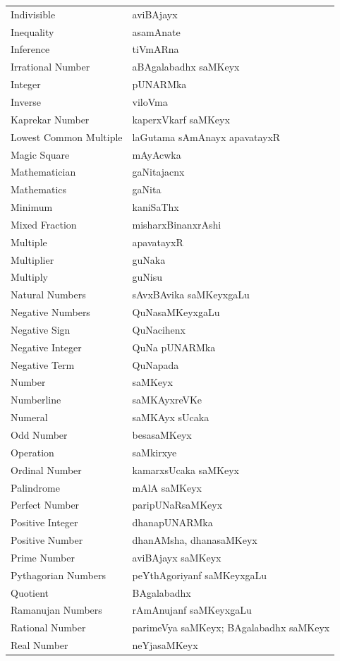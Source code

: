 \begin{longtable}{>{\rm}l@{\hspace{1.25cm}}l}
Indivisible & aviBAjayx\\
Inequality & asamAnate\\
Inference & tiVmARna\\
Irrational Number & aBAgalabadhx saMKeyx\\
Integer & pUNARMka\\
Inverse & viloVma\\
Kaprekar Number & kaperxVkarf saMKeyx\\
Lowest Common Multiple & laGutama sAmAnayx apavatayxR\\
Magic Square & mAyAcwka\\
Mathematician & gaNitajacnx\\
Mathematics & gaNita\\
Minimum & kaniSaThx\\
Mixed Fraction & misharxBinanxrAshi\\
Multiple & apavatayxR\\
Multiplier & guNaka\\
Multiply & guNisu\\
Natural Numbers & sAvxBAvika saMKeyxgaLu\\
Negative Numbers & QuNasaMKeyxgaLu\\
Negative Sign & QuNacihenx\\
Negative Integer & QuNa pUNARMka\\
Negative Term & QuNapada\\
Number & saMKeyx\\
Numberline & saMKAyxreVKe\\
Numeral & saMKAyx sUcaka\\
Odd Number & besasaMKeyx\\
Operation & saMkirxye\\
Ordinal Number & kamarxsUcaka saMKeyx\\
Palindrome & mAlA saMKeyx\\
Perfect Number & paripUNaRsaMKeyx\\
Positive Integer & dhanapUNARMka\\
Positive Number & dhanAMsha, dhanasaMKeyx\\
Prime Number & aviBAjayx saMKeyx\\
Pythagorian Numbers  & peYthAgoriyanf saMKeyxgaLu\\
Quotient & BAgalabadhx\\
Ramanujan Numbers & rAmAnujanf saMKeyxgaLu\\
Rational Number & parimeVya saMKeyx; BAgalabadhx saMKeyx\\
Real Number & neYjasaMKeyx\\

\end{longtable}
